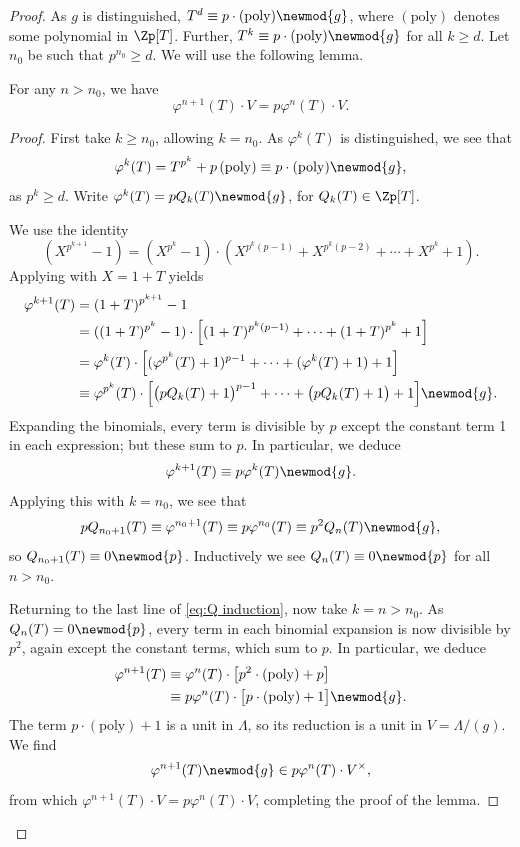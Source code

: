 \documentclass[a4paper,10pt, english, reqno]{smfart}
\numberwithin{equation}{section}
\begin{document}
\begin{proof}
As $g$ is distinguished, $T^d \equiv p \cdot (\mathrm{poly}) \newmod{g}$,  where $(\mathrm{poly})$ denotes some polynomial in $\Zp[T]$. Further, $T^k \equiv p \cdot (\mathrm{poly}) \newmod{g}$ for all $k \geq d$. Let $n_0$ be such that $p^{n_0} \geq d$. We will use the following lemma.


\begin{lemma} \label{lemmatempIw} For any $n > n_0$, we have
\[
\varphi^{n+1}(T)\cdot V = p \varphi^n(T) \cdot V.
\]
\end{lemma}

\begin{proof}
First take $k \geq n_0$, allowing $k = n_0$. As $\varphi^k(T)$ is distinguished, we see that
\[
    \varphi^{k}(T) = T^{p^k} + p \, (\mathrm{poly})  \equiv p \cdot (\mathrm{poly}) \newmod{g},
\]
as $p^k \geq d$. Write $\varphi^k(T) = pQ_k(T) \newmod{g}$, for $Q_k(T) \in \Zp[T]$.

We use the identity
\[
    (X^{p^{k+1}} - 1) = (X^{p^k} - 1) \cdot (X^{p^k(p-1)} + X^{p^k(p-2)} + \cdots + X^{p^k} + 1).
\]
Applying with $X = 1+T$ yields
\begin{align}
    \varphi^{k+1}(T) &= (1+T)^{p^{k+1}} - 1\notag\\
    &= ((1+T)^{p^k} - 1) \cdot \Big[(1+T)^{p^k(p-1)} + \cdots + (1+T)^{p^k} + 1\Big]\notag\\
    &= \varphi^{k}(T) \cdot \Big[(\varphi^{p^k}(T) +1)^{p-1} + \cdots + (\varphi^{k}(T) +1) + 1\Big]\notag\\
    &\equiv \varphi^{p^k}(T) \cdot \Big[ \big(pQ_k(T) + 1\big)^{p-1}  + \cdots + \big(pQ_k(T)+1\big) + 1\Big] \newmod{g}. \label{eq:Q induction}
\end{align}
Expanding the binomials, every term is divisible by $p$ except the constant term 1 in each expression; but these sum to $p$. In particular, we deduce
\[
\varphi^{k+1}(T) \equiv p\varphi^k(T) \newmod{g}.
\]
Applying this with $k = n_0$, we see that 
\[
    pQ_{n_0+1}(T) \equiv \varphi^{n_0+1}(T) \equiv p\varphi^{n_0}(T) \equiv p^2Q_n(T) \newmod{g},
\]
so $Q_{n_0+1}(T) \equiv 0 \newmod{p}$. Inductively we see $Q_n(T) \equiv 0 \newmod{p}$ for all $n > n_0$.

Returning to the last line of \eqref{eq:Q induction}, now take $k = n > n_0$. As $Q_n(T) = 0 \newmod{p}$, every term in each binomial expansion is now divisible by $p^2$, again except the constant terms, which sum to $p$. In particular, we deduce
\begin{align*}
    \varphi^{n+1}(T) &\equiv \varphi^n(T) \cdot \big[p^2\cdot (\mathrm{poly}) + p\big] \\
    &\equiv p\varphi^n(T) \cdot \big[p \cdot (\mathrm{poly}) + 1\big] \newmod{g}.
\end{align*}
The term $p\cdot(\mathrm{poly}) + 1$ is a unit in $\Lambda$, so its reduction is a unit in $V = \Lambda/(g)$. We find 
\[
    \varphi^{n+1}(T) \newmod{g}\in p\varphi^n(T) \cdot V^\times,
\]
from which $\varphi^{n+1}(T) \cdot V = p\varphi^n(T) \cdot V$, completing the proof of the lemma.
\end{proof}


\end{proof}
\end{document}
